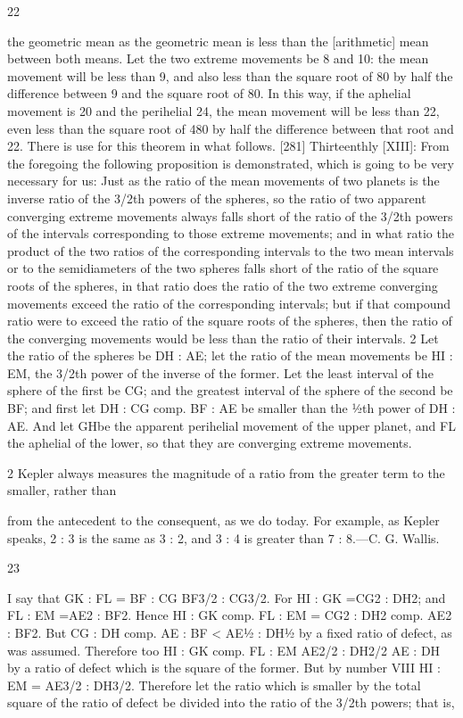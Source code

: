 \documentclass{article}
\begin{document}
22

the geometric mean as the geometric mean is less than the [arithmetic]
mean between both means. Let the two extreme movements be 8 and 10:
the mean movement will be less than 9, and also less than the square
root of 80 by half the difference between 9 and the square root of 80. In
this way, if the aphelial movement is 20 and the perihelial 24, the mean
movement will be less than 22, even less than the square root of 480 by
half the difference between that root and 22. There is use for this
theorem in what follows.
[281] Thirteenthly [XIII]: From the foregoing the following proposition
is demonstrated, which is going to be very necessary for us: Just as the
ratio of the mean movements of two planets is the inverse ratio of the
3/2th powers of the spheres, so the ratio of two apparent converging
extreme movements always falls short of the ratio of the 3/2th powers of
the intervals corresponding to those extreme movements; and in what
ratio the product of the two ratios of the corresponding intervals to the
two mean intervals or to the semidiameters of the two spheres falls short
of the ratio of the square roots of the spheres, in that ratio does the ratio
of the two extreme converging movements exceed the ratio of the
corresponding intervals; but if that compound ratio were to exceed the
ratio of the square roots of the spheres, then the ratio of the converging
movements would be less than the ratio of their intervals. 2
Let the ratio of the spheres be DH : AE; let the ratio of the mean
movements be HI : EM, the 3/2th power of the inverse of the former.
Let the least interval of the sphere of the first be CG; and the greatest
interval of the sphere of the second be BF; and first
let DH : CG comp. BF : AE be smaller than the ½th power of DH : AE.
And let GHbe the apparent perihelial movement of the upper planet,
and FL the aphelial of the lower, so that they are converging extreme
movements.

2 Kepler always measures the magnitude of a ratio from the greater term to the smaller, rather than

from the antecedent to the consequent, as we do today. For example, as Kepler speaks, 2 : 3 is the
same as 3 : 2, and 3 : 4 is greater than 7 : 8.—C. G. Wallis.


23

I say that
GK : FL = BF : CG
BF3/2 : CG3/2.
For
HI : GK =CG2 : DH2;
and
FL : EM =AE2 : BF2.
Hence
HI : GK comp. FL : EM = CG2 : DH2 comp. AE2 : BF2.
But
CG : DH comp. AE : BF < AE½ : DH½
by a fixed ratio of defect, as was assumed. Therefore too
HI : GK comp. FL : EM AE2/2 : DH2/2
AE : DH
by a ratio of defect which is the square of the former. But by number VIII
HI : EM = AE3/2 : DH3/2.
Therefore let the ratio which is smaller by the total square of the ratio of
defect be divided into the ratio of the 3/2th powers; that is,
\end{document}
